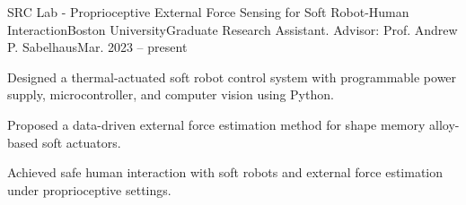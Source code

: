 \begin{rSubsection}{SRC Lab - Proprioceptive External Force Sensing for Soft Robot-Human Interaction}{Boston University}{Graduate Research Assistant. Advisor: Prof. Andrew P. Sabelhaus}{Mar. 2023 -- present}
\item Designed a thermal-actuated soft robot control system with programmable power supply, microcontroller, and computer vision using Python.
\item Proposed a data-driven external force estimation method for shape memory alloy-based soft actuators.
\item Achieved safe human interaction with soft robots and external force estimation under proprioceptive settings.
\end{rSubsection}
